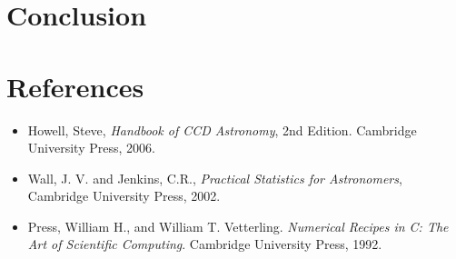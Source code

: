 \documentclass[authoryear, 12pt,5p, times]{elsarticle}
\begin{document}
\section{Conclusion}

 \section{References}
%
\begin{itemize}
\item Howell, Steve,  \textit{Handbook of CCD Astronomy}, 2nd Edition. Cambridge University Press, 2006.
\item Wall, J. V. and Jenkins, C.R., \textit{Practical Statistics for Astronomers}, Cambridge University Press, 2002.
\item Press, William H., and William T. Vetterling. \textit{Numerical Recipes in C: The Art of Scientific Computing}. Cambridge University Press, 1992. 
\end{itemize}
\end{document}
